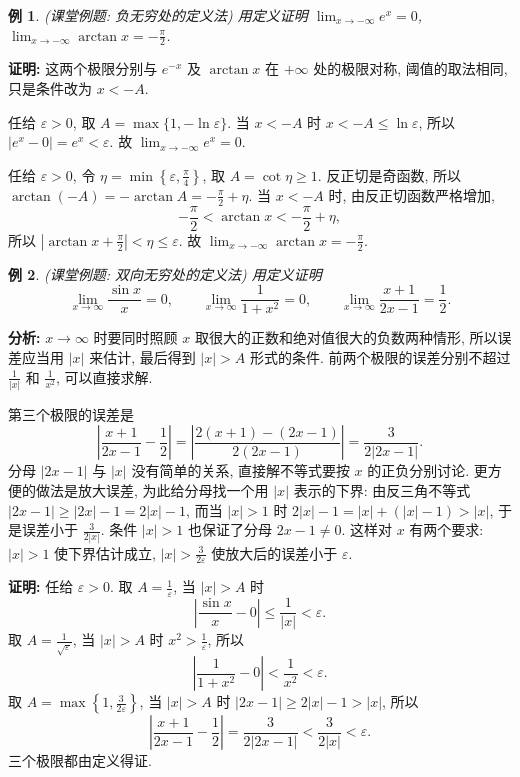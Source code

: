 \documentclass[UTF8,openany]{ctexbook}
\theoremstyle{chinesetextbook}
\newtheorem{example}{例}[section]
\newenvironment{cnproof}{\par\indent\textbf{证明:} \ignorespaces}{\par}
\begin{document}
\begin{example}
\textnormal{(课堂例题: 负无穷处的定义法)} 用定义证明 $\displaystyle\lim_{x\to-\infty}e^x=0$, $\displaystyle\lim_{x\to-\infty}\arctan x=-\frac\pi2$.
\end{example}
\begin{cnproof}
这两个极限分别与 $e^{-x}$ 及 $\arctan x$ 在 $+\infty$ 处的极限对称, 阈值的取法相同, 只是条件改为 $x<-A$.

任给 $\varepsilon>0$, 取 $A=\max\{1,-\ln\varepsilon\}$. 当 $x<-A$ 时 $x<-A\le\ln\varepsilon$, 所以 $|e^x-0|=e^x<\varepsilon$. 故 $\displaystyle\lim_{x\to-\infty}e^x=0$.

任给 $\varepsilon>0$, 令 $\displaystyle\eta=\min\left\{\varepsilon,\frac\pi4\right\}$, 取 $A=\cot\eta\ge1$. 反正切是奇函数, 所以 $\displaystyle\arctan(-A)=-\arctan A=-\frac\pi2+\eta$. 当 $x<-A$ 时, 由反正切函数严格增加,
\[
-\frac\pi2<\arctan x<-\frac\pi2+\eta,
\]
所以 $\displaystyle\left|\arctan x+\frac\pi2\right|<\eta\le\varepsilon$. 故 $\displaystyle\lim_{x\to-\infty}\arctan x=-\frac\pi2$.
\end{cnproof}
\begin{example}
\textnormal{(课堂例题: 双向无穷处的定义法)} 用定义证明
\[
\lim_{x\to\infty}\frac{\sin x}x=0,\qquad\lim_{x\to\infty}\frac1{1+x^2}=0,\qquad\lim_{x\to\infty}\frac{x+1}{2x-1}=\frac12.
\]
\end{example}
\par\indent\textbf{分析:} $x\to\infty$ 时要同时照顾 $x$ 取很大的正数和绝对值很大的负数两种情形, 所以误差应当用 $|x|$ 来估计, 最后得到 $|x|>A$ 形式的条件. 前两个极限的误差分别不超过 $\displaystyle\frac1{|x|}$ 和 $\displaystyle\frac1{x^2}$, 可以直接求解.

第三个极限的误差是
\[
\left|\frac{x+1}{2x-1}-\frac12\right|=\left|\frac{2(x+1)-(2x-1)}{2(2x-1)}\right|=\frac3{2|2x-1|}.
\]
分母 $|2x-1|$ 与 $|x|$ 没有简单的关系, 直接解不等式要按 $x$ 的正负分别讨论. 更方便的做法是放大误差, 为此给分母找一个用 $|x|$ 表示的下界: 由反三角不等式 $|2x-1|\ge|2x|-1=2|x|-1$, 而当 $|x|>1$ 时 $2|x|-1=|x|+(|x|-1)>|x|$, 于是误差小于 $\displaystyle\frac3{2|x|}$. 条件 $|x|>1$ 也保证了分母 $2x-1\ne0$. 这样对 $x$ 有两个要求: $|x|>1$ 使下界估计成立, $\displaystyle|x|>\frac3{2\varepsilon}$ 使放大后的误差小于 $\varepsilon$.
\begin{cnproof}
任给 $\varepsilon>0$. 取 $\displaystyle A=\frac1\varepsilon$, 当 $|x|>A$ 时
\[
\left|\frac{\sin x}x-0\right|\le\frac1{|x|}<\varepsilon.
\]
取 $\displaystyle A=\frac1{\sqrt\varepsilon}$, 当 $|x|>A$ 时 $\displaystyle x^2>\frac1\varepsilon$, 所以
\[
\left|\frac1{1+x^2}-0\right|<\frac1{x^2}<\varepsilon.
\]
取 $\displaystyle A=\max\left\{1,\frac3{2\varepsilon}\right\}$, 当 $|x|>A$ 时 $|2x-1|\ge2|x|-1>|x|$, 所以
\[
\left|\frac{x+1}{2x-1}-\frac12\right|=\frac3{2|2x-1|}<\frac3{2|x|}<\varepsilon.
\]
三个极限都由定义得证.
\end{cnproof}
\end{document}
